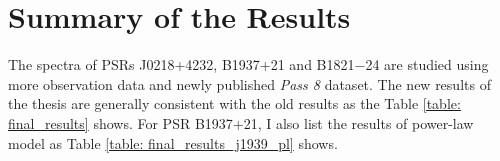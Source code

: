 \documentclass[a4paper, 12pt]{report}
\begin{document}
  \section{Summary of the Results}
    The spectra of PSRs J0218+4232, B1937+21 and B1821$-$24 are studied using more observation 
    data and newly published \textit{Pass 8} dataset. The new results of the thesis are 
    generally consistent with the old results as the Table \ref{table: final_results} shows. 
    For PSR B1937+21, I also list the results of power-law model as Table 
    \ref{table: final_results_j1939_pl} shows.
    \begin{table}[!htp]
      \centering
        \caption[Fit parameters of the spectra model of PSR J0218+4232.]
          {Fit parameters of the spectra model of PSR J0218+4232. 
          The names of parameters are consistent with Equation
          \ref{eq: fermi_model}. The previous results are from  
          \cite{0004-637X-787-2-167,0067-0049-208-2-17}}
        \label{table: final_results}        

    \end{table}  
\end{document}
